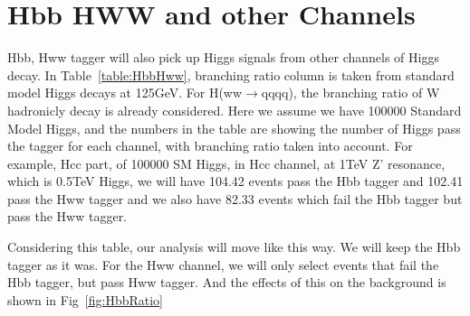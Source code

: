 \newpage
\section{Hbb HWW and other Channels}
\label{sec:contamination}

Hbb, Hww tagger will also pick up Higgs signals from other channels of Higgs decay. 
In Table~\ref{table:HbbHww}, branching ratio column is taken from standard model Higgs decays at 125GeV. 
For H(ww$\to$qqqq), the branching ratio of W hadronicly decay is already considered. 
Here we assume we have 100000 Standard Model Higgs, and the numbers in the table are showing the number of Higgs pass
the tagger for each channel, with branching ratio taken into account. 
For example, Hcc part, of 100000 SM Higgs,  in Hcc channel, at 1TeV Z' resonance, which is 0.5TeV Higgs, 
we will have 104.42 events pass the Hbb tagger and 102.41 pass the Hww tagger and we also have 82.33 events which fail the 
Hbb tagger but pass the Hww tagger.  

Considering this table, our analysis will move like this way. 
We will keep the Hbb tagger as it was. 
For the Hww channel, we will only select events that fail the Hbb tagger, but pass Hww tagger.
And the effects of this on the background is shown in Fig~\ref{fig:HbbRatio} 


